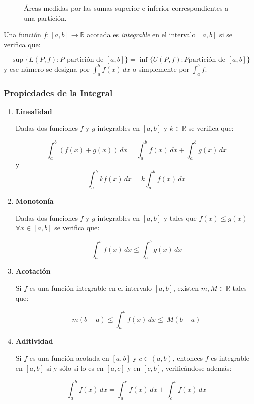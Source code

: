 \begin{figure}[htbp]
\centering {}\qquad\qquad
{}
\caption{Áreas medidas por las sumas superior e inferior
correspondientes a una partición.} \label{g:sumassupinf}
\end{figure}

Una función $f:[a,b]\rightarrow\mathbb{R}$ acotada es
\emph{integrable} en el intervalo $[a,b]$ si se verifica que:

\[
\ \sup\{L(P,f): P \textrm{ partición de } [a,b]\}=\inf\{U(P,f): P \textrm{
partición de }[a,b]\}
\]
y ese número se designa por $\int_{a}^{b}f(x)\,dx$ o simplemente por
$\int_{a}^{b}f$.


\subsubsection*{Propiedades de la Integral}

\begin{enumerate}

\item \textbf{Linealidad}

Dadas dos funciones $f$ y $g$ integrables en $[a,b]$ y $k \in
\mathbb{R}$ se verifica que:

\[
\ \int_{a}^{b}(f(x)+g(x))\,dx=\int_{a}^{b}f(x)\,dx+\int_{a}^{b}g(x)\,dx
\]
y
\[
\ \int_{a}^{b}{kf(x)}\,dx=k\int_{a}^{b}{f(x)}\,dx
\]

\item \textbf{Monotonía}

Dadas dos funciones $f$ y $g$ integrables en $[a,b]$ y tales que
$f(x)\leq g(x)$ $\forall x \in [a,b]$ se verifica que:


\[
\ \int_{a}^{b}{f(x)\,dx} \leq \int_{a}^{b}{g(x)\,dx}
\]

\item \textbf{Acotación}

Si $f$ es una función integrable en el intervalo $[a,b]$, existen
$m,M\in\mathbb{R}$ tales que:

\[
\ m(b-a)\leq\int_{a}^{b}{f(x)\,dx} \leq \ M(b-a)
\]

\item \textbf{Aditividad}

Si $f$ es una función acotada en $[a,b]$ y $c\in(a,b)$, entonces $f$
es integrable en $[a,b]$ si y sólo si lo es en $[a,c]$ y en $[c,b]$,
verificándose además:

\[
\ \int_{a}^{b}{f(x)\,dx} = \int_{a}^{c}{f(x)\,dx}+\int_{c}^{b}{f(x)\,dx}
\]\\

\end{enumerate}

